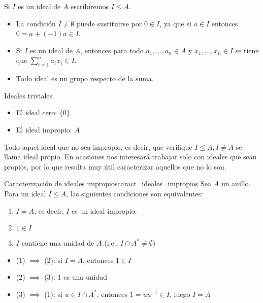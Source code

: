 Si $I$ es un ideal de $A$ escribiremos $I \leq A$.

\begin{remark}
    \begin{itemize}
        \item La condición \(I \neq \emptyset\) puede sustituirse por \(0 \in I\), ya que si \(a \in I\) entonces \(0 = a + (-1)a \in I\).
        \item Si \(I\) es un ideal de \(A\), entonces para todo \(a_1, \ldots, a_n \in A\) y \(x_1, \ldots, x_n \in I\) se tiene que \(\sum_{i=1}^n a_i x_i \in I\).
        \item Todo ideal es un grupo respecto de la suma.
    \end{itemize}
\end{remark}

\begin{example}{Ideales triviales}{}
    \begin{itemize}
        \item El {ideal cero}: \(\{0\}\)
        \item El {ideal impropio}: \(A\)
    \end{itemize}
\end{example}

Todo aquel ideal que no sea impropio, es decir, que verifique $I \leq A, I \neq A$ se llama ideal propio. En ocasiones nos interesará trabajar solo con ideales que sean propios, por lo que resulta muy útil caracterizar aquellos que no lo son.

\begin{lemma}{Caracterización de ideales impropios}{caract_ideales_impropios}
    Sea \(A\) un anillo. Para un ideal \(I \leq A\), las siguientes condiciones son equivalentes:
    \begin{enumerate}
        \item \(I = A\), es decir, $I$ es un ideal impropio.
        \item \(1 \in I\)
        \item \(I\) contiene una unidad de \(A\) (i.e., \(I \cap A^* \neq \emptyset\))
    \end{enumerate}
\end{lemma}

\begin{proofbox}
    \begin{itemize}
        \item (1) \(\implies\) (2): si \(I = A\), entonces \(1 \in I\)
        \item (2) \(\implies\) (3): \(1\) es una unidad
        \item (3) \(\implies\) (1): si \(u \in I \cap A^*\), entonces \(1 = uu^{-1} \in I\), luego \(I = A\)
    \end{itemize}
\end{proofbox}

